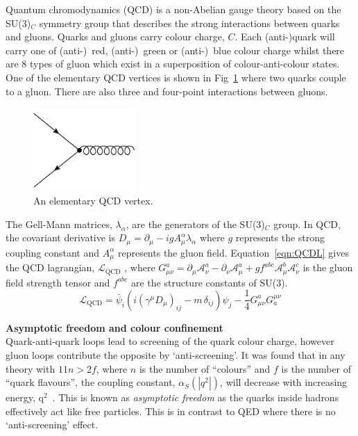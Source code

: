 Quantum chromodynamics (QCD) is a non-Abelian gauge theory based on the SU(3)$_{C}$ symmetry group that describes the strong interactions between quarks and gluons. Quarks and gluons carry colour charge, $C$. Each (anti-)quark will carry one of (anti-)~red, (anti-)~green or (anti-)~blue colour charge whilst there are 8 types of gluon which exist in a superposition of colour-anti-colour states. One of the elementary QCD vertices is shown in Fig~\ref{fig:QCDvertex} where two quarks couple to a gluon. There are also three and four-point interactions between gluons.
\label{subsec:QCD}
\begin{figure}[ht!]
\begin{center}
    \includegraphics[width=0.35\textwidth]{images/Theory/QCDvertex.png}
    \caption{An elementary QCD vertex.}
    \label{fig:QCDvertex}
\end{center}
\end{figure}

The Gell-Mann matrices, $\lambda_{\alpha}$, are the generators of the SU(3)$_{C}$ group. In QCD, the covariant derivative is $D_{\mu} = \partial_{\mu} - i g A^{\alpha}_{\mu} \lambda_{\alpha}$ where $g$ represents the strong coupling constant and $A^{\alpha}_{\mu}$ represents the gluon field.
Equation~\ref{eqn:QCDL} gives the QCD lagrangian, $\mathcal{L}_{\textrm {QCD}}$ , where $G_{\mu \nu }^{a}=\partial _{\mu }{\mathcal {A}}_{\nu }^{a}-\partial _{\nu }{\mathcal {A}}_{\mu }^{a}+gf^{abc}{\mathcal {A}}_{\mu }^{b}{\mathcal {A}}_{\nu }^{c}$ is the gluon field strength tensor and $f^{abc}$ are the structure constants of SU(3). 
\begin{equation}
    \label{eqn:QCDL}
{\mathcal {L}}_{\mathrm {QCD} }={\bar {\psi }}_{i}\left(i(\gamma ^{\mu }D_{\mu })_{ij}-m\,\delta _{ij}\right)\psi _{j}-{\frac {1}{4}}G_{\mu \nu }^{a}G_{a}^{\mu \nu }
\end{equation}

\textbf{Asymptotic freedom and colour confinement}\\
Quark-anti-quark loops lead to screening of the quark colour charge, however gluon loops contribute the opposite by `anti-screening'. It was found that in any theory with $11n>2f$, where $n$ is the number of ``colours'' and $f$ is the number of ``quark flavours'', the coupling constant, $\alpha_{S}\left( |q^{2}| \right)$, will decrease with increasing energy, q$^{2}$~\cite{PhysRevLett.30.1343,PhysRevLett.30.1346}. This is known as \emph{asymptotic freedom} as the quarks inside hadrons effectively act like free particles. This is in contrast to QED where there is no `anti-screening' effect.

